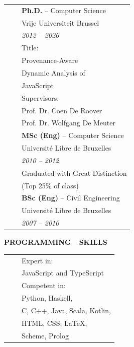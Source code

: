 \documentclass[a4paper,11pt,english]{article}
\newcommand{\LeftColumn}[0]{6.0cm}
\newcommand{\ItemSkip}[0]{4pt}
\newcommand{\SubItemSkip}[0]{0pt}
\newcommand{\SubSubItemSkip}[0]{0pt}
\newcommand{\Bullet}[0]{\faCaretRight~~}
\newcommand{\Rubric}[1]{\colorbox{gray!20}{\parbox{\linewidth}{\centering\sffamily\bfseries{}#1}}}
\begin{document}
\begin{minipage}[t]{\LeftColumn}
\begin{tabular}{@{}l@{}l@{}}
\textcolor{gray}{\Bullet} & \textbf{Ph.D.} -- Computer Science \\[\SubSubItemSkip]
& Vrije Universiteit Brussel \\[\SubItemSkip]
& \emph{2012 -- 2026} \\[\SubItemSkip]
& Title:\\[\SubSubItemSkip]
& \quad Provenance-Aware \\[\SubSubItemSkip]
& \quad Dynamic Analysis of \\[\SubSubItemSkip]
& \quad JavaScript \\[\SubItemSkip]
& Supervisors: \\[\SubSubItemSkip]
& \quad Prof. Dr. Coen De Roover\\[\SubSubItemSkip]
& \quad Prof. Dr. Wolfgang De Meuter\\[\ItemSkip]
\Bullet & \textbf{MSc (Eng)} -- Computer Science \\[\SubItemSkip]
& Université Libre de Bruxelles \\[\SubItemSkip]
& \emph{2010 -- 2012} \\[\SubItemSkip]
& Graduated with Great Distinction \\[\SubSubItemSkip]
& \quad (Top 25\% of class) \\[\ItemSkip]
\Bullet & \textbf{BSc (Eng)} -- Civil Engineering \\[\SubItemSkip]
& Université Libre de Bruxelles \\[\SubItemSkip]
& \emph{2007 -- 2010} \\[0pt]
\end{tabular}

\vspace{12pt}\Rubric{\faCode \quad PROGRAMMING~~SKILLS}\vspace{8pt}

\begin{tabularx}{\linewidth}{@{}l@{}l@{}}
\Bullet & Expert in: \\[0pt]
& \quad JavaScript and TypeScript \\[\ItemSkip]
\Bullet & Competent in: \\[0pt]
& \quad Python, Haskell, \\[0pt]
& \quad C, C++, Java, Scala, Kotlin, \\[0pt]
& \quad HTML, CSS, LaTeX, \\[0pt]
& \quad Scheme, Prolog \\[0pt]
\end{tabularx}

\end{minipage}
\end{document}
